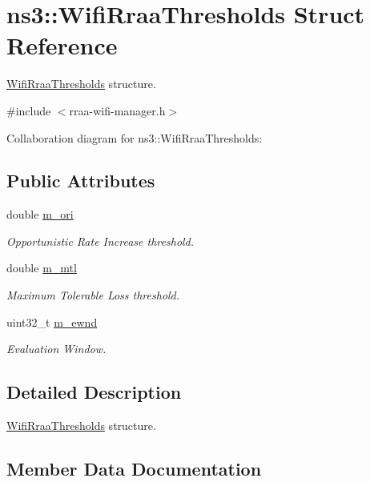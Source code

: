 \hypertarget{structns3_1_1WifiRraaThresholds}{}\section{ns3\+:\+:Wifi\+Rraa\+Thresholds Struct Reference}
\label{structns3_1_1WifiRraaThresholds}


\hyperlink{structns3_1_1WifiRraaThresholds}{Wifi\+Rraa\+Thresholds} structure.  




{\ttfamily \#include $<$rraa-\/wifi-\/manager.\+h$>$}



Collaboration diagram for ns3\+:\+:Wifi\+Rraa\+Thresholds\+:
\subsection*{Public Attributes}
\begin{DoxyCompactItemize}
\item 
double \hyperlink{structns3_1_1WifiRraaThresholds_ad5cbc663fec23b90226f9ba07fd26d08}{m\+\_\+ori}
\begin{DoxyCompactList}\small\item\em Opportunistic Rate Increase threshold. \end{DoxyCompactList}\item 
double \hyperlink{structns3_1_1WifiRraaThresholds_a12c6b09aab59c6176e01d82aec721edc}{m\+\_\+mtl}
\begin{DoxyCompactList}\small\item\em Maximum Tolerable Loss threshold. \end{DoxyCompactList}\item 
uint32\+\_\+t \hyperlink{structns3_1_1WifiRraaThresholds_a583f54fbc0a1b878fb63a602b79c4c37}{m\+\_\+ewnd}
\begin{DoxyCompactList}\small\item\em Evaluation Window. \end{DoxyCompactList}\end{DoxyCompactItemize}


\subsection{Detailed Description}
\hyperlink{structns3_1_1WifiRraaThresholds}{Wifi\+Rraa\+Thresholds} structure. 

\subsection{Member Data Documentation}
